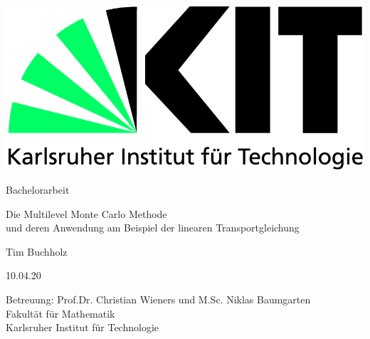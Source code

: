 \documentclass[12pt,a4paper]{scrartcl}
\theoremstyle{definition}
\numberwithin{equation}{section}
\begin{document}
  \pagestyle{empty}
  
  
  \begin{titlepage}

    \includegraphics[scale=0.45]{kit-logo.jpg} 
    \vspace*{2cm} 

 \begin{center} \large 
    
    Bachelorarbeit
    \vspace*{2cm}

    {\huge\linespread{1.6} Die Multilevel Monte Carlo Methode\\ und deren Anwendung am Beispiel der linearen\- Transportgleichung}
    \vspace*{2.5cm}

    Tim Buchholz
    \vspace*{1.5cm}

    10.04.20
    \vspace*{4.5cm}


    {Betreuung: Prof.Dr. Christian Wieners und M.Sc. Niklas Baumgarten \\[1cm]
    Fakultät für Mathematik \\
    Karlsruher Institut für Technologie}
  \end{center}
\end{titlepage}



  \tableofcontents

\newpage
 


  \pagestyle{headings}



%

 \newpage  %
 
\end{document}
